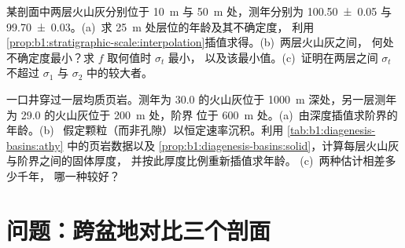 \begin{exercise}[$\star\star\star$]\label{exo:b1:stratigraphic-scale:11}
某剖面中两层火山灰分别位于 \qty{10}{m} 与 \qty{50}{m} 处，测年分别为
\qty[uncertainty-mode=separate]{100.50(5)}{\Ma} 与 \qty[uncertainty-mode=separate]{99.70(3)}{\Ma}。(a)~求
\qty{25}{m} 处层位的年龄及其不确定度，
利用\cref{prop:b1:stratigraphic-scale:interpolation}插值求得。(b)~两层火山灰之间，
何处不确定度最小？求 $f$ 取何值时 $\sigma_t$ 最小，
以及该最小值。(c)~证明在两层之间 $\sigma_t$ 不超过 $\sigma_1$ 与
$\sigma_2$ 中的较大者。
\end{exercise}

\begin{exercise}[$\star\star\star$]\label{exo:b1:stratigraphic-scale:12}
一口井穿过一层均质页岩。测年为 \qty{30.0}{\Ma} 的火山灰位于
\qty{1000}{m} 深处，另一层测年为 \qty{29.0}{\Ma} 的火山灰位于 \qty{200}{m} 处，阶界
位于 \qty{600}{m} 处。(a)~由深度插值求阶界的年龄。(b)~
假定颗粒（而非孔隙）以恒定速率沉积。利用
\cref{tab:b1:diagenesis-basins:athy} 中的页岩数据以及
\cref{prop:b1:diagenesis-basins:solid}，计算每层火山灰与阶界之间的固体厚度，
并按此厚度比例重新插值求年龄。
(c)~两种估计相差多少千年，
哪一种较好？
\end{exercise}

\section{问题：跨盆地对比三个剖面}

